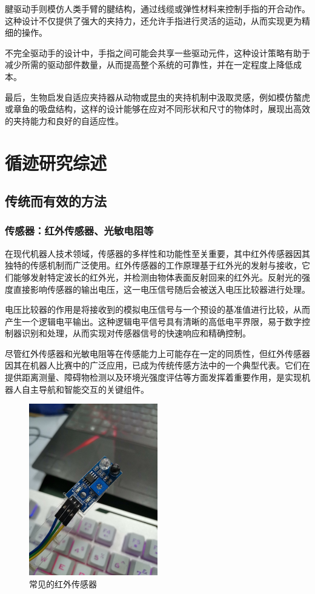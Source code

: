 \documentclass{report}
\begin{document}
腱驱动手则模仿人类手臂的腱结构，通过线缆或弹性材料来控制手指的开合动作。这种设计不仅提供了强大的夹持力，还允许手指进行灵活的运动，从而实现更为精细的操作。

不完全驱动手的设计中，手指之间可能会共享一些驱动元件，这种设计策略有助于减少所需的驱动部件数量，从而提高整个系统的可靠性，并在一定程度上降低成本。

最后，生物启发自适应夹持器从动物或昆虫的夹持机制中汲取灵感，例如模仿螯虎或章鱼的吸盘结构，这样的设计能够在应对不同形状和尺寸的物体时，展现出高效的夹持能力和良好的自适应性。


\newpage
\section{循迹研究综述}
\subsection{传统而有效的方法\cite{intro2023robot}}
\label{subsec:label}
\subsubsection{传感器：红外传感器、光敏电阻等}
\label{subsec:label}
在现代机器人技术领域，传感器的多样性和功能性至关重要，其中红外传感器因其独特的传感机制而广泛使用。红外传感器的工作原理基于红外光的发射与接收，它们能够发射特定波长的红外光，并检测由物体表面反射回来的红外光。反射光的强度直接影响传感器的输出电压，这一电压信号随后会被送入电压比较器进行处理。

电压比较器的作用是将接收到的模拟电压信号与一个预设的基准值进行比较，从而产生一个逻辑电平输出。这种逻辑电平信号具有清晰的高低电平界限，易于数字控制器识别和处理，从而实现对传感器信号的快速响应和精确控制。

尽管红外传感器和光敏电阻等在传感能力上可能存在一定的同质性，但红外传感器因其在机器人比赛中的广泛应用，已成为传统传感方法中的一个典型代表。它们在提供距离测量、障碍物检测以及环境光强度评估等方面发挥着重要作用，是实现机器人自主导航和智能交互的关键组件。
\begin{figure}[ht]
  \centering
  \includegraphics[width=0.5\textwidth]{figures/sensor.jpg}
  \caption{ 常见的红外传感器}
\end{figure}
\end{document}
